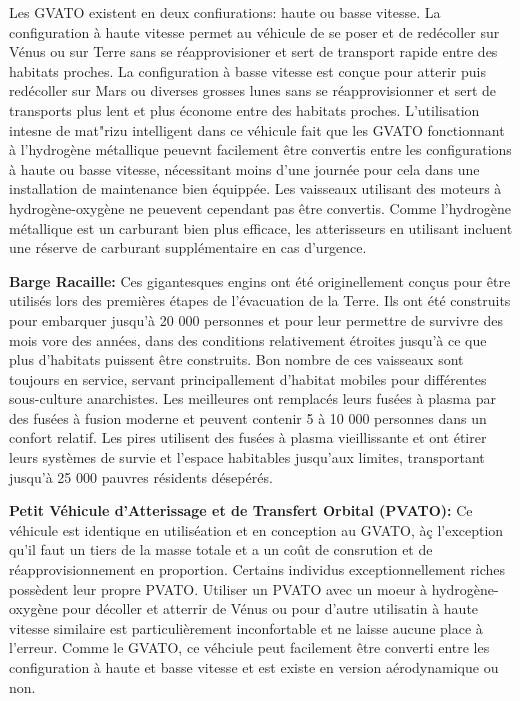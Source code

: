 Les GVATO existent en deux confiurations: haute ou basse vitesse. La configuration à haute vitesse permet au véhicule de se poser et de redécoller sur Vénus ou sur Terre sans se réapprovisioner et sert de transport rapide entre des habitats proches. La configuration à basse vitesse est conçue pour atterir puis redécoller sur Mars ou diverses grosses lunes sans se réapprovisionner et sert de transports plus lent et plus économe entre des habitats proches. L'utilisation intesne de mat"rizu intelligent dans ce véhicule fait que les GVATO fonctionnant à l'hydrogène métallique peuevnt facilement être convertis entre les configurations à haute ou basse vitesse, nécessitant moins d'une journée pour cela dans une installation de maintenance bien équippée. Les vaisseaux utilisant des moteurs à hydrogène-oxygène ne peuevent cependant pas être convertis. Comme l'hydrogène métallique est un carburant bien plus efficace, les atterisseurs en utilisant incluent une réserve de carburant supplémentaire en cas d'urgence. 

\textbf{Barge Racaille:} Ces gigantesques engins ont été originellement conçus pour être utilisés lors des premières étapes de l'évacuation de la Terre. Ils ont été construits pour embarquer jusqu'à 20 000 personnes et pour leur permettre de survivre des mois vore des années, dans des conditions relativement étroites jusqu'à ce que plus d'habitats puissent être construits. Bon nombre de ces vaisseaux sont toujours en service, servant principallement d'habitat mobiles pour différentes sous-culture anarchistes. Les meilleures ont remplacés leurs fusées à plasma par des fusées à fusion moderne et peuvent contenir 5 à 10 000 personnes dans un confort relatif. Les pires utilisent des fusées à plasma vieillissante et ont étirer leurs systèmes de survie et l'espace habitables jusqu'aux limites, transportant jusqu'à 25 000 pauvres résidents désepérés. 

\textbf{Petit Véhicule d'Atterissage et de Transfert Orbital (PVATO):} Ce véhicule est identique en utiliséation et en conception au GVATO, àç l'exception qu'il faut un tiers de la masse totale et a un coût de consrution et de réapprovisionnement en proportion. Certains individus exceptionnellement riches possèdent leur propre PVATO. Utiliser un PVATO avec un moeur à hydrogène-oxygène pour décoller et atterrir de Vénus ou pour d'autre utilisatin à haute vitesse similaire est particulièrement inconfortable et ne laisse aucune place à l'erreur. Comme le GVATO, ce véhciule peut facilement être converti entre les configuration à haute et basse vitesse et est existe en version aérodynamique ou non. 

